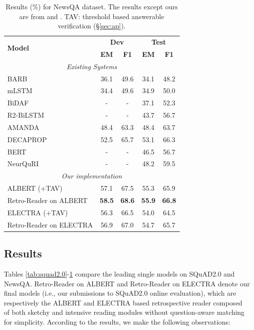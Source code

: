 \documentclass[letterpaper]{article} %
\begin{document}
\begin{table}
	\centering
	\setlength{\tabcolsep}{4.2pt}
	{
		\begin{tabular}{l c c c c }
			\toprule
			\multirow{2}{*}{\textbf{Model} }& \multicolumn{2}{c}{\textbf{Dev}} & \multicolumn{2}{c}{\textbf{Test}}\\
			& \textbf{EM} & \textbf{F1}&   \textbf{EM} & \textbf{F1}\\
			\midrule
			\multicolumn{5}{c}{\emph{Existing Systems}} \\
			BARB \cite{trischler2017newsqa} &36.1  & 49.6 & 34.1 & 48.2  \\
			mLSTM \cite{DBLP:conf/iclr/Wang017a} & 34.4 & 49.6 & 34.9 & 50.0 \\
			BiDAF \cite{Seo2016Bidirectional} & - & - & 37.1 & 52.3  \\
			R2-BiLSTM \cite{DBLP:journals/corr/Weissenborn17} & - & - & 43.7 & 56.7  \\
			AMANDA \cite{DBLP:conf/aaai/KunduN18} & 48.4& 63.3 &48.4 &63.7  \\
			DECAPROP \cite{tay2018densely} & 52.5 &65.7 &53.1 &66.3 \\
			BERT \cite{devlin2018bert} & - & - & 46.5 & 56.7 \\
			NeurQuRI \cite{back2020neurquri} & - & - & 48.2 & 59.5 \\
			\midrule
			\multicolumn{5}{c}{\emph{Our implementation}} \\
			ALBERT (+TAV) & 57.1 & 67.5 & 55.3 & 65.9\\
			Retro-Reader on ALBERT  &  \textbf{58.5} & \textbf{68.6} & \textbf{55.9} &  \textbf{66.8} \\
			ELECTRA (+TAV)  & 56.3 & 66.5 & 54.0 & 64.5\\
			Retro-Reader on ELECTRA & 56.9 &  67.0 & 54.7& 65.7 \\
			\bottomrule
		\end{tabular}
	}
	\caption{Results (\%) for NewsQA dataset. The results except ours are from \citeauthor{tay2018densely}  and \citeauthor{back2020neurquri} . TAV: threshold based answerable verification (\S\ref{sec:ap}).}\label{tab:newsqa}
\end{table}



\subsection{Results}
Tables \ref{tab:squad2.0}-\ref{tab:newsqa} compare the leading single models on SQuAD2.0 and NewsQA.
Retro-Reader on ALBERT and Retro-Reader on ELECTRA denote our final models (i.e., our submissions to SQuAD2.0 online evaluation), which are respectively the ALBERT and ELECTRA based retrospective reader composed of both sketchy and intensive reading modules without question-aware matching for simplicity. %
According to the results, we make the following observations:
\end{document}
